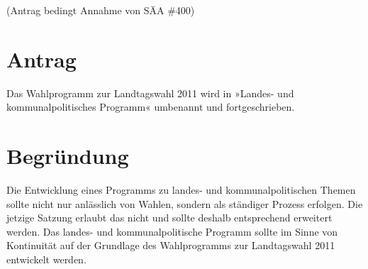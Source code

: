 (Antrag bedingt Annahme von SÄA \#400)

\section{Antrag}

Das Wahlprogramm zur Landtagswahl 2011 wird in »Landes- und kommunalpolitisches Programm« umbenannt und fortgeschrieben.

\section{Begründung}

Die Entwicklung eines Programms zu landes- und kommunalpolitischen Themen sollte nicht nur anlässlich von Wahlen, sondern als ständiger Prozess erfolgen. Die jetzige Satzung erlaubt das nicht und sollte deshalb entsprechend erweitert werden. Das landes- und kommunalpolitische Programm sollte im Sinne von Kontinuität auf der Grundlage des Wahlprogramms zur Landtagswahl 2011 entwickelt werden.
